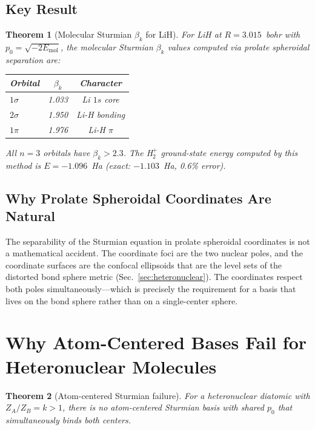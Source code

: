 \documentclass[aps,pra,twocolumn,superscriptaddress,longbibliography]{revtex4-2}
\newtheorem{theorem}{Theorem}
\begin{document}
\subsection{Key Result}

\begin{theorem}[Molecular Sturmian $\beta_k$ for LiH]
\label{thm:lih_beta}
For LiH at $R = 3.015$~bohr with $p_0 = \sqrt{-2E_{\text{mol}}}$,
the molecular Sturmian $\beta_k$ values computed via prolate spheroidal
separation are:
\begin{center}
\begin{tabular}{lcc}
Orbital & $\beta_k$ & Character \\
\hline
$1\sigma$ & 1.033 & Li $1s$ core \\
$2\sigma$ & 1.950 & Li-H bonding \\
$1\pi$ & 1.976 & Li-H $\pi$ \\
\end{tabular}
\end{center}
All $n = 3$ orbitals have $\beta_k > 2.3$.  The H$_2^+$ ground-state
energy computed by this method is $E = -1.096$~Ha (exact: $-1.103$~Ha,
0.6\% error).
\end{theorem}

\subsection{Why Prolate Spheroidal Coordinates Are Natural}

The separability of the Sturmian equation in prolate spheroidal
coordinates is not a mathematical accident.  The coordinate foci are
the two nuclear poles, and the coordinate surfaces are the confocal
ellipsoids that are the level sets of the distorted bond sphere metric
(Sec.~\ref{sec:heteronuclear}).  The coordinates respect both poles
simultaneously---which is precisely the requirement for a basis that
lives on the bond sphere rather than on a single-center sphere.


\section{Why Atom-Centered Bases Fail for Heteronuclear Molecules}
\label{sec:failure}

\begin{theorem}[Atom-centered Sturmian failure]
\label{thm:failure}
For a heteronuclear diatomic with $Z_A/Z_B = k > 1$, there is no
atom-centered Sturmian basis with shared $p_0$ that simultaneously
binds both centers.
\end{theorem}
\end{document}
